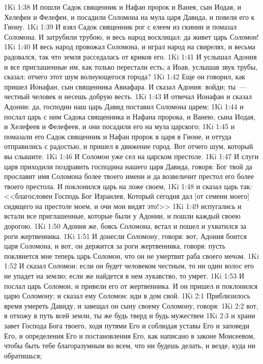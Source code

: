 \vs 1Ki 1:38 И пошли Садок священник и Нафан пророк и Ванея, сын Иодая, и Хелефеи и Фелефеи, и посадили Соломона на мула царя Давида, и повели его к Гиону.
\vs 1Ki 1:39 И взял Садок священник рог с елеем из скинии и помазал Соломона. И затрубили трубою, и весь народ восклицал: да живет царь Соломон!
\vs 1Ki 1:40 И весь народ провожал Соломона, и играл народ на свирелях, и весьма радовался, так что земля расседалась от криков его.
\vs 1Ki 1:41 И услышал Адония и все приглашенные им, как только перестали есть; а Иоав, услышав звук трубы, сказал: отчего этот шум волнующегося города?
\vs 1Ki 1:42 Еще он говорил, как пришел Ионафан, сын священника Авиафара. И сказал Адония: войди; ты~--- честный человек и несешь добрую весть.
\vs 1Ki 1:43 И отвечал Ионафан и сказал Адонии: да, господин наш царь Давид поставил Соломона царем;
\vs 1Ki 1:44 и послал царь с ним Садока священника и Нафана пророка, и Ванею, сына Иодая, и Хелефеев и Фелефеев, и они посадили его на мула царского;
\vs 1Ki 1:45 и помазали его Садок священник и Нафан пророк в царя в Гионе, и оттуда отправились с радостью, и пришел в движение город. Вот отчего шум, который вы слышите.
\vs 1Ki 1:46 И Соломон уже сел на царском престоле.
\vs 1Ki 1:47 И слуги царя приходили поздравить господина нашего царя Давида, говоря: Бог твой да прославит имя Соломона более твоего имени и да возвеличит престол его более твоего престола. И поклонился царь на ложе своем,
\vs 1Ki 1:48 и сказал царь так: <<благословен Господь Бог Израилев, Который сегодня дал [от семени моего] сидящего на престоле моем, и очи мои видят это!>>
\vs 1Ki 1:49  испугались и встали все приглашенные, которые были у Адонии, и пошли каждый своею дорогою.
\vs 1Ki 1:50 Адония же, боясь Соломона, встал и пошел и ухватился за роги жертвенника.
\vs 1Ki 1:51 И донесли Соломону, говоря: вот, Адония боится царя Соломона, и вот, он держится за роги жертвенника, говоря: пусть поклянется мне теперь царь Соломон, что он не умертвит раба своего мечом.
\vs 1Ki 1:52 И сказал Соломон: если он будет человеком честным, то ни один волос его не упадет на землю; если же найдется в нем лукавство, то умрет.
\vs 1Ki 1:53 И послал царь Соломон, и привели его от жертвенника. И он пришел и поклонился царю Соломону; и сказал ему Соломон: иди в дом свой.
\vs 1Ki 2:1 Приблизилось время умереть Давиду, и завещал он сыну своему Соломону, говоря:
\vs 1Ki 2:2 вот, я отхожу в путь всей земли, ты же будь тверд и будь мужествен
\vs 1Ki 2:3 и храни завет Господа Бога твоего, ходя путями Его и соблюдая уставы Его и заповеди Его, и определения Его и постановления Его, как написано в законе Моисеевом, чтобы быть тебе благоразумным во всем, что ни будешь делать, и везде, куда ни обратишься;
